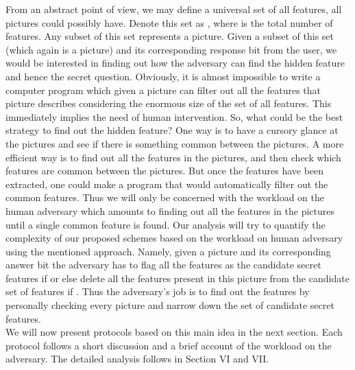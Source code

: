 \documentclass{llncs}
\begin{document}
From an abstract point of view, we may define a universal set of all features, all pictures could possibly have. Denote this set as , where  is the total number of features. Any subset of this set represents a picture. Given a subset  of this set (which again is a picture) and its corresponding response bit  from the user, we would be interested in finding out how the adversary can find the hidden feature and hence the secret question. Obviously, it is almost impossible to write a computer program which given a picture can filter out all the features that picture describes considering the enormous size of the set of all features. This immediately implies the need of human intervention. So, what could be the best strategy to find out the hidden feature? One way is to have a cursory glance at the pictures and see if there is something common between the pictures. A more efficient way is to find out all the features in the pictures, and then check which features are common between the pictures. But once the features have been extracted, one could make a program that would automatically filter out the common features. Thus we will only be concerned with the workload on the human adversary which amounts to finding out all the features in the pictures until a single common feature is found. Our analysis will try to quantify the complexity of our proposed schemes based on the workload on human adversary using the mentioned approach. Namely, given a picture  and its corresponding answer bit  the adversary has to flag all the features as the candidate secret features if  or else delete all the features present in this picture from the candidate set of features if . Thus the adversary's job is to find out the features by personally checking every picture and narrow down the set of candidate secret features.\\
We will now present protocols based on this main idea in the next section. Each protocol follows a short discussion and a brief account of the workload on the adversary. The detailed analysis follows in Section VI and VII.
\end{document}
